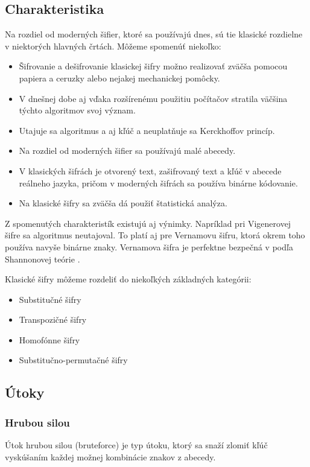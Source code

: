 \subsection{Charakteristika}
Na rozdiel od moderných šifier, ktoré sa používajú dnes, sú tie klasické rozdielne v niektorých hlavných črtách.
Môžeme spomenúť niekoľko:
\begin{itemize}
\item Šifrovanie a dešifrovanie klasickej šifry možno realizovať zväčša pomocou papiera a ceruzky alebo nejakej mechanickej pomôcky.
\item V dnešnej dobe aj vďaka rozšírenému použitiu počítačov stratila väčšina týchto algoritmov svoj význam.
\item Utajuje sa algoritmus a aj kľúč a neuplatňuje sa Kerckhoffov princíp.
\item Na rozdiel od moderných šifier sa používajú malé abecedy.
\item V klasických šifrách je otvorený text, zašifrovaný text a kľúč v abecede reálneho jazyka, pričom v moderných šifrách sa používa binárne kódovanie.
\item Na klasické šifry sa zväčša dá použiť štatistická analýza. 
\end{itemize}
Z spomenutých charakteristík existujú aj výnimky. Napríklad pri Vigenerovej šifre sa algoritmus neutajoval. To platí aj pre Vernamovu šifru, ktorá okrem toho používa navyše binárne znaky. Vernamova šifra je perfektne bezpečná v podľa Shannonovej teórie \cite{ks}.

Klasické šifry môžeme rozdeliť do niekoľkých základných kategórii:
\begin{itemize}
\item Substitučné šifry
\item Transpozičné šifry
\item Homofónne šifry
\item Substitučno-permutačné šifry
\end{itemize}

\subsection{Útoky}
\subsubsection{Hrubou silou}
Útok hrubou silou (bruteforce) je typ útoku, ktorý sa snaží zlomiť kľúč vyskúšaním každej možnej kombinácie znakov z abecedy.


